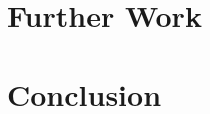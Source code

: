 \documentclass[10pt]{beamer}
\begin{document}

\section{Further Work}



\section{Conclusion}






\end{document}
